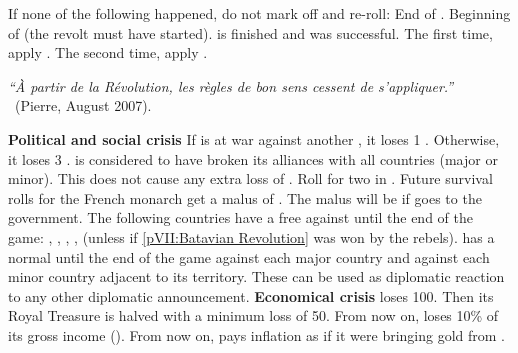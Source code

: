 \condition{}
\aparag If none of the following happened, do not mark off and re-roll:
\bparag End of .
\bparag Beginning of  (the revolt must have
started).
\bparag {} is finished and was successful.
\aparag The first time, apply . The second
time, apply .
\begin{designnote}
  \textit{``\`{A} partir de la R\'{e}volution, les r\`{e}gles de bon sens
    cessent de s'appliquer.''}\\
  ~\hfill (Pierre, August 2007).
\end{designnote}



\phevnt
\aparag \textbf{Political and social crisis}
\bparag If \FRA is at war against another \MAJ, it loses 1 \STAB. Otherwise,
it loses 3 \STAB.
\bparag \FRA is considered to have broken its alliances with all countries
(major or minor). This does not cause any extra loss of \STAB.
\bparag Roll for two \REVOLT in \paysmajeurFrance.
\bparag Future survival rolls for the French monarch get a malus of
. The malus will be  if \FRA goes to the
\monarqueConvention government.
\bparag The following countries have a free \CB against \FRA until the end of
the game: \ENG, \AUS, \PRU, \HIS, \HOL (unless if \ref{pVII:Batavian
  Revolution} was won by the rebels).
\bparag \FRA has a normal \CB until the end of the game against each major
country and against each minor country adjacent to its territory.
\bparag These \CB can be used as diplomatic reaction to any other diplomatic
announcement.
\aparag \textbf{Economical crisis}
\bparag \FRA loses 100\ducats. Then its Royal Treasure is halved %
with a minimum loss of 50\ducats.
\bparag From now on, \FRA loses 10\% of its gross income
().
\bparag From now on, \FRA pays inflation as if it were bringing gold from
\continentAmerica.

